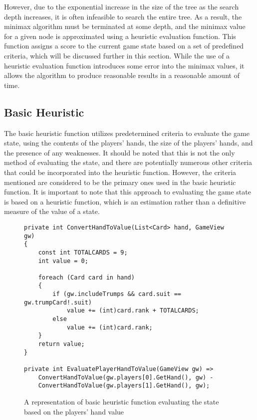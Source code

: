 However, due to the exponential increase in the size of the tree as the search depth increases, it is often infeasible to search the entire tree. As a result, the minimax algorithm must be terminated at some depth, and the minimax value for a given node is approximated using a heuristic evaluation function. This function assigns a score to the current game state based on a set of predefined criteria, which will be discussed further in this section. While the use of a heuristic evaluation function introduces some error into the minimax values, it allows the algorithm to produce reasonable results in a reasonable amount of time.

\subsection{Basic Heuristic}
The basic heuristic function utilizes predetermined criteria to evaluate the game state, using the contents of the players' hands, the size of the players' hands, and the presence of any weaknesses. It should be noted that this is not the only method of evaluating the state, and there are potentially numerous other criteria that could be incorporated into the heuristic function. However, the criteria mentioned are considered to be the primary ones used in the basic heuristic function. It is important to note that this approach to evaluating the game state is based on a heuristic function, which is an estimation rather than a definitive measure of the value of a state.

\begin{figure}[h]
\captionsetup{justification=centering}
\begin{lstlisting}[frame=single]
private int ConvertHandToValue(List<Card> hand, GameView gw)
{
    const int TOTALCARDS = 9;
    int value = 0;

    foreach (Card card in hand)
    {
        if (gw.includeTrumps && card.suit == gw.trumpCard!.suit)
            value += (int)card.rank + TOTALCARDS;
        else
            value += (int)card.rank;
    }
    return value;
}

private int EvaluatePlayerHandToValue(GameView gw) =>
    ConvertHandToValue(gw.players[0].GetHand(), gw) -
    ConvertHandToValue(gw.players[1].GetHand(), gw);
\end{lstlisting}
\caption{A representation of basic heuristic function evaluating the state based on the players' hand value}
\label{fig:BHPlayersHandValue}
\end{figure}

